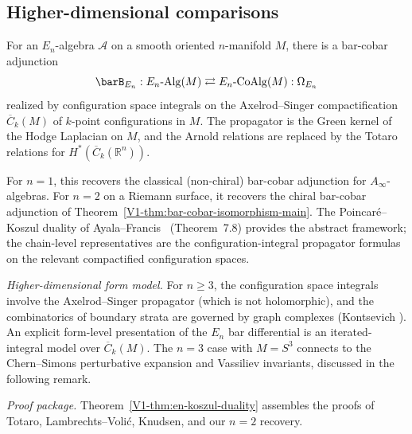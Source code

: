 \subsection{Higher-dimensional comparisons}
\label{sec:higher-dimensional-comparisons}

\begin{theorem}\label{thm:en-koszul}
For an $E_n$-algebra $\mathcal{A}$ on a smooth oriented $n$-manifold $M$,
there is a bar-cobar adjunction
\begin{equation}\label{eq:en-bar-cobar}
\barB_{E_n}: E_n\text{-}\mathrm{Alg}(M)
\rightleftarrows
E_n\text{-}\mathrm{CoAlg}(M) :\Omega_{E_n}
\end{equation}
realized by configuration space integrals on the Axelrod--Singer
compactification $\overline{C}_k(M)$ of $k$-point configurations in $M$.
The propagator is the Green kernel of the Hodge Laplacian on $M$, and
the Arnold relations are replaced by the Totaro relations
\cite{Totaro96} for $H^*(\overline{C}_k(\mathbb{R}^n))$.

For $n = 1$, this recovers the classical (non-chiral) bar-cobar
adjunction for $A_\infty$-algebras. For $n = 2$ on a Riemann surface,
it recovers the chiral bar-cobar adjunction of
Theorem~\textup{\ref*{V1-thm:bar-cobar-isomorphism-main}}.
The Poincar\'e--Koszul duality of Ayala--Francis~\cite{AF15}
\textup{(}Theorem~7.8\textup{)} provides the abstract framework;
the chain-level representatives are the configuration-integral
propagator formulas on the relevant compactified configuration spaces.

\emph{Higher-dimensional form model.} For $n \geq 3$, the configuration space integrals involve
the Axelrod--Singer propagator (which is not holomorphic), and the
combinatorics of boundary strata are governed by graph complexes
(Kontsevich \cite{Kon94}). An explicit form-level presentation of the
$E_n$ bar differential is an iterated-integral model over
$\overline{C}_k(M)$. The $n = 3$ case
with $M = S^3$ connects to the Chern--Simons perturbative expansion and
Vassiliev invariants, discussed in the following remark.

\emph{Proof package.} Theorem~\textup{\ref*{V1-thm:en-koszul-duality}}
assembles the proofs of Totaro, Lambrechts--Voli\'c, Knudsen, and
our $n = 2$ recovery.
\end{theorem}


